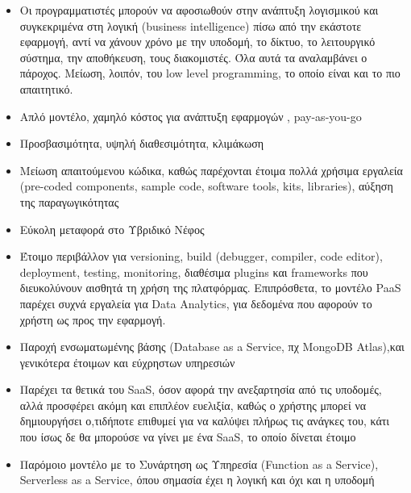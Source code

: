\documentclass{article}
\begin{document}
\begin{itemize}
\item Οι προγραμματιστές μπορούν να αφοσιωθούν στην ανάπτυξη λογισμικού και συγκεκριμένα στη λογική (business intelligence) πίσω από την εκάστοτε εφαρμογή, αντί να χάνουν χρόνο με την υποδομή, το δίκτυο, το λειτουργικό σύστημα, την αποθήκευση, τους διακομιστές. Όλα αυτά τα αναλαμβάνει ο πάροχος. Μείωση, λοιπόν, του low level programming, το οποίο είναι και το πιο απαιτητικό.
\item Απλό μοντέλο, χαμηλό κόστος για ανάπτυξη εφαρμογών , pay-as-you-go
\item Προσβασιμότητα, υψηλή διαθεσιμότητα, κλιμάκωση
\item Μείωση απαιτούμενου κώδικα, καθώς παρέχονται έτοιμα πολλά χρήσιμα εργαλεία (pre-coded components, sample code, software tools, kits, libraries), αύξηση της παραγωγικότητας 
\item Εύκολη μεταφορά στο Υβριδικό Νέφος
\item Έτοιμο περιβάλλον για versioning, build (debugger, compiler, code editor), deployment, testing, monitoring, διαθέσιμα plugins και frameworks που διευκολύνουν αισθητά τη χρήση της πλατφόρμας. Επιπρόσθετα,  το μοντέλο PaaS παρέχει συχνά εργαλεία για Data Analytics, για δεδομένα που αφορούν το χρήστη ως προς την εφαρμογή.
\item Παροχή ενσωματωμένης βάσης (Database as a Service, πχ MongoDB Atlas),και γενικότερα έτοιμων και εύχρηστων υπηρεσιών
\item Παρέχει τα θετικά του SaaS, όσον αφορά την ανεξαρτησία από τις υποδομές, αλλά προσφέρει ακόμη και επιπλέον ευελιξία, καθώς ο χρήστης μπορεί να δημιουργήσει ο,τιδήποτε επιθυμεί για να καλύψει πλήρως τις ανάγκες του, κάτι που ίσως δε θα μπορούσε να γίνει με ένα SaaS, το οποίο δίνεται έτοιμο 
\item Παρόμοιο μοντέλο με το Συνάρτηση ως Υπηρεσία (Function as a Service), Serverless as a Service, όπου σημασία έχει η λογική και όχι και η υποδομή
\end{itemize}
\end{document}
